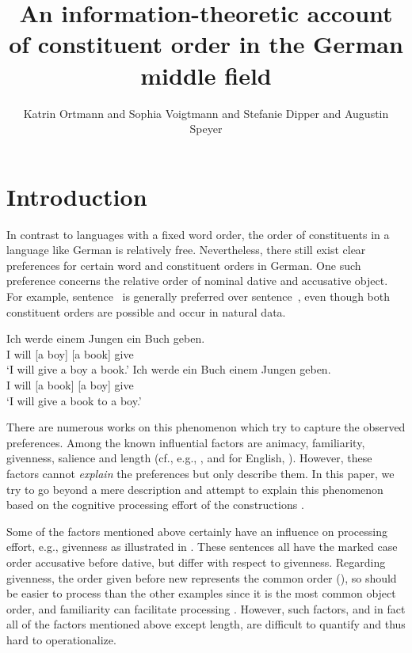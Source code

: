 \documentclass[output=paper,colorlinks,citecolor=brown]{langscibook}
\author{Katrin Ortmann%
\affiliation{Ruhr-Universität Bochum} and
        Sophia Voigtmann\orcid{0009-0002-2504-4117}
        \affiliation{Universität des Saarlandes} and
        Stefanie Dipper\orcid{0000-0003-4357-9078}\affiliation{Ruhr-Universität Bochum} and
        Augustin Speyer\orcid{0000-0003-1027-2635}\affiliation{Universität des Saarlandes}}
\title[Constituent order in the German middle field]{An information-theoretic account of constituent order in the German middle field}
\begin{document}
\maketitle

\section{Introduction}\label{sec:intro}
In contrast to languages with a fixed word order, the order of constituents in a language like German is relatively free. Nevertheless, there still exist clear preferences for certain  word and constituent orders in German. One such preference concerns the relative order of nominal dative and accusative object.
For example, sentence~ is generally preferred over sentence~, even though both constituent orders are possible and occur in natural data.

\ea
  \ea\label{ex:dat-acc}
  \gll Ich werde \up{[}einem Jungen\up{]\sub{\textsc{dat}}} \up{[}ein Buch\up{]\sub{\textsc{acc}}} geben. \\
   I will [a boy] [a book] give \\
   \glt `I will give a boy a book.'
%
   \ex\label{ex:acc-dat}
   \gll Ich werde \up{[}ein Buch\up{]\sub{\textsc{acc}}} \up{[}einem Jungen\up{]\sub{\textsc{dat}}} geben. \\
    I will [a book] [a boy] give \\
    \glt `I will give a book to a boy.'
    \z
\z


There are numerous works on this phenomenon which try to capture the observed preferences. Among the known influential factors are animacy, familiarity, givenness, salience and length (cf., e.g., \citealt{lenerz77,speyer11, Behagel}, and for English, \citealt{bresnan07}). However, these factors cannot \textit{explain} the preferences but only describe them. In this paper, we try to go beyond a mere description and attempt to explain this phenomenon based on the cognitive processing effort of the constructions \citep[cf., e.g.,][]{Fenk-Oczlon}. 

Some of the factors mentioned above certainly have an influence on processing effort, e.g., givenness as illustrated in . These sentences all have the marked case order accusative before dative, but differ with respect to givenness. Regarding givenness, the order given before new represents the common order (), so  should be easier to process than the other examples since it is the most common object order, and familiarity can facilitate processing \citep[cf., e.g.][]{Futrell}. However, such factors, and in fact all of the factors mentioned above except length, are difficult to quantify and thus hard to operationalize.
\end{document}
